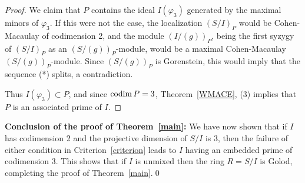 \documentclass[11pt]{amsart}
\def\phi{{\varphi}}
\begin{document}
\begin{proof}
We claim that $P$ contains the ideal $I(\phi_{3})$ generated by the maximal minors of $\phi_{3}$.
If this were not the case, the localization $(S/I)_P$ would be Cohen-Macaulay of codimension 2, and the module
$(I/(g))_P$, being the first syzygy of $(S/I)_P$ as an $(S/(g))_P$-module, would be a maximal Cohen-Macaulay $(S/(g))_P$-module.
Since $(S/(g))_P$ is Gorenstein, this would imply that the 
sequence (*) splits, a contradiction. 

Thus $I(\phi_3)\subset P$, and since $\operatorname{codim} P = 3$, Theorem~\ref{WMACE}, (3) implies that $P$ is an associated prime of $I$.
\end{proof}
\medbreak

\noindent\textbf{Conclusion of the proof of Theorem~\ref{main}: } We have now shown that if $I$ has codimension 2 and the projective dimension of $S/I$ is 3, then the failure of either condition in Criterion~\ref{criterion} leads to $I$ having
an embedded prime of codimension 3. This shows that if $I$ is unmixed then the ring $R = S/I$ is Golod, completing the proof of Theorem~\ref{main}.\qed





\end{document}
